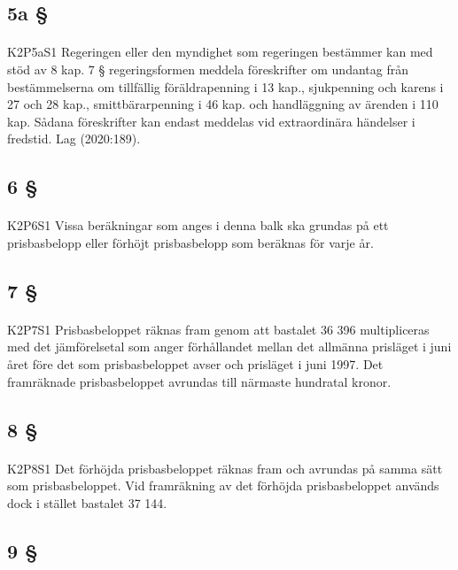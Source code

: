 \documentclass[a4paper,notitlepage,openany,10pt]{book}
\begin{document}
\subsection*{5a §}
\paragraph*{}
{\tiny K2P5aS1}
Regeringen eller den myndighet som regeringen bestämmer kan med stöd av 8 kap. 7 § regeringsformen meddela föreskrifter om undantag från bestämmelserna om tillfällig föräldrapenning i 13 kap., sjukpenning och karens i 27 och 28 kap., smittbärarpenning i 46 kap. och handläggning av ärenden i 110 kap. Sådana föreskrifter kan endast meddelas vid extraordinära händelser i fredstid.
Lag (2020:189).
\subsection*{6 §}
\paragraph*{}
{\tiny K2P6S1}
Vissa beräkningar som anges i denna balk ska grundas på ett prisbasbelopp eller förhöjt prisbasbelopp som beräknas för varje år.
\subsection*{7 §}
\paragraph*{}
{\tiny K2P7S1}
Prisbasbeloppet räknas fram genom att bastalet 36 396 multipliceras med det jämförelsetal som anger förhållandet mellan det allmänna prisläget i juni året före det som prisbasbeloppet avser och prisläget i juni 1997. Det framräknade prisbasbeloppet avrundas till närmaste hundratal kronor.
\subsection*{8 §}
\paragraph*{}
{\tiny K2P8S1}
Det förhöjda prisbasbeloppet räknas fram och avrundas på samma sätt som prisbasbeloppet. Vid framräkning av det förhöjda prisbasbeloppet används dock i stället bastalet 37 144.
\subsection*{9 §}
\end{document}
